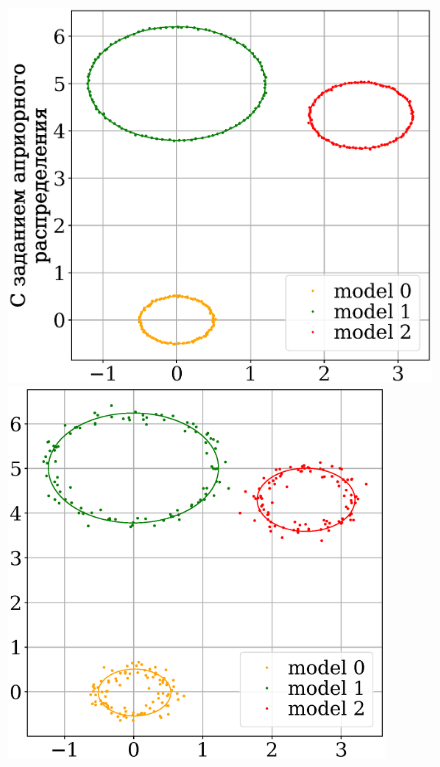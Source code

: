 \documentclass[12pt,twoside]{article}
\begin{document}
\begin{figure}[h!]
\begin{minipage}{.32\textwidth}
      \includegraphics[width =  \textwidth]{910.eps}
\end{minipage}
\begin{minipage}{.32\textwidth}
\hspace{0.3mm}
      \includegraphics[width =  0.89\textwidth]{901.eps}
\end{minipage}

\end{figure}
\end{document}
